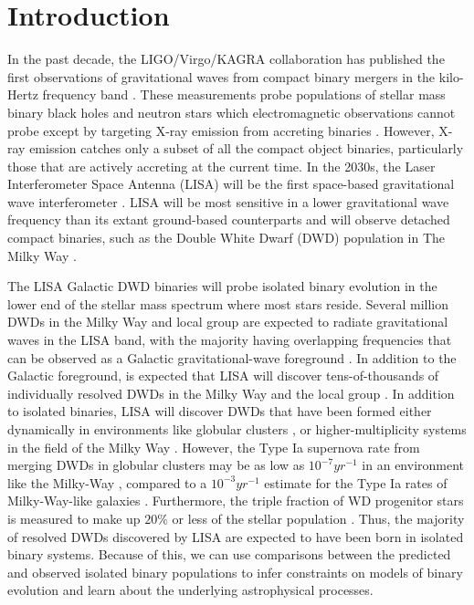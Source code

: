 \documentclass[twocolumn]{aastex631}
\newcommand*{\citepLVK}{\citep{GW150914-detection}}
\newcommand*{\citepLISAMission}{\citep{LISA-white}}
\newcommand*{\citepLISAGalacticBinaries}{\citep{Nelemans2001,Ruiter2010,Toonen2012TypeIa,Korol2017,Korol2018,Lamberts2019,Breivik2020,Korol2022}}
\begin{document}
\section{Introduction}
\label{sec:intro}
In the past decade, the LIGO/Virgo/KAGRA collaboration has published
    the first observations of gravitational waves from
    compact binary mergers in the kilo-Hertz frequency band
    \citepLVK{}.
These measurements probe populations of stellar mass
    binary black holes and neutron stars 
    which electromagnetic observations cannot probe
    except by targeting X-ray emission from accreting binaries
    \citep{Fabbiano2006,Remillard_2006,miller-jones_2014, Inoue2022, Fortin2023}.
However, X-ray emission catches only a subset of all the compact object binaries,
    particularly those that are actively accreting at the current time.
In the 2030s, the Laser Interferometer Space Antenna (LISA) will
    be the first space-based gravitational wave interferometer
    \citepLISAMission{}.
LISA will be most sensitive in a lower gravitational wave frequency than
    its extant ground-based counterparts
    and will observe detached compact binaries,
    such as the Double White Dwarf (DWD)
    population in The Milky Way
    \citepLISAGalacticBinaries{} .

The LISA Galactic DWD binaries will probe isolated binary evolution
    in the lower end of the stellar mass spectrum where most stars reside.
Several million DWDs in the Milky Way and local group are expected to 
    radiate gravitational waves in the LISA band, with the majority having overlapping 
    frequencies that can be observed as a Galactic gravitational-wave 
    foreground \citep[e.g.][]{Benacquista2006, Breivik2020b, Staelens2024,Hofman2024}.
In addition to the Galactic foreground, is expected that LISA will discover tens-of-thousands of individually 
    resolved DWDs in the Milky Way \citep[e.g.][]{Nelemans2001,Nissanke2012,Tang2024} 
    and the local group \citep[e.g.][]{Korol2018b, Roebber2020, Korol2020, Keim2023}.
In addition to isolated binaries,
    LISA will discover DWDs that have been formed either dynamically
    in environments like globular clusters 
    \citep[][]{Willems2007,Kremer2018},
    or higher-multiplicity systems in the field of the Milky Way
    \citep[e.g.][]{2023ASPC..534..275O}.
However, the Type Ia supernova rate from merging DWDs in globular clusters
    may be as low as $10^{-7} yr^{-1}$
    in an environment like the Milky-Way
    \citep{Kremer2020,Kremer2021},
    compared to a $10^{-3}yr^{-1}$ estimate for the Type Ia rates
    of Milky-Way-like galaxies \citep[][]{Frohmaier2018}.
Furthermore, the triple fraction of WD progenitor stars is measured to make up 
    $20\%$ or less of the stellar population \citep[e.g.][]{2023ASPC..534..275O}.
Thus, the majority of resolved DWDs discovered by LISA are 
    expected to have been born in isolated binary systems.
Because of this, we can use comparisons between the predicted 
    and observed isolated binary populations to infer constraints on
    models of binary evolution and learn about the underlying astrophysical processes.
\end{document}
